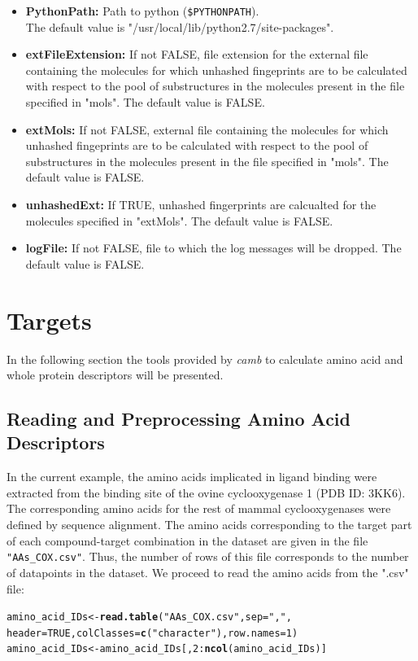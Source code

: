\documentclass[twoside,a4wide,12pt]{article}\usepackage[]{graphicx}\usepackage[]{color}
\makeatletter
\newcommand{\hlnum}[1]{\textcolor[rgb]{0.686,0.059,0.569}{#1}}%
\newcommand{\hlstr}[1]{\textcolor[rgb]{0.192,0.494,0.8}{#1}}%
\newcommand{\hlopt}[1]{\textcolor[rgb]{0,0,0}{#1}}%
\newcommand{\hlstd}[1]{\textcolor[rgb]{0.345,0.345,0.345}{#1}}%
\newcommand{\hlkwb}[1]{\textcolor[rgb]{0.69,0.353,0.396}{#1}}%
\newcommand{\hlkwc}[1]{\textcolor[rgb]{0.333,0.667,0.333}{#1}}%
\newcommand{\hlkwd}[1]{\textcolor[rgb]{0.737,0.353,0.396}{\textbf{#1}}}%
\newenvironment{kframe}{%
 \def\at@end@of@kframe{}%
 \ifinner\ifhmode%
  \def\at@end@of@kframe{\end{minipage}}%
  \begin{minipage}{\columnwidth}%
 \fi\fi%
 \def\FrameCommand##1{\hskip\@totalleftmargin \hskip-\fboxsep
 \colorbox{shadecolor}{##1}\hskip-\fboxsep
     \hskip-\linewidth \hskip-\@totalleftmargin \hskip\columnwidth}%
 \MakeFramed {\advance\hsize-\width
   \@totalleftmargin\z@ \linewidth\hsize
   \@setminipage}}%
 {\par\unskip\endMakeFramed%
 \at@end@of@kframe}
\newenvironment{knitrout}{}{} %
\makeatother
\begin{document}
\begin{itemize}
\item {\bf PythonPath:} Path to python (\verb|$PYTHONPATH|).\\
The default value is "/usr/local/lib/python2.7/site-packages".
\item {\bf extFileExtension:} If not FALSE, file extension for the external file containing the molecules for which unhashed fingeprints are to be calculated with respect to the pool of substructures in the molecules present in the file specified in "mols". The default value is FALSE.
\item {\bf extMols:} If not FALSE, external file containing the molecules for which unhashed fingeprints are to be calculated with respect to the pool of
substructures in the molecules present in the file specified in "mols". The default value is FALSE.
\item {\bf unhashedExt:} If TRUE, unhashed fingerprints are calcualted for the molecules specified in "extMols". The default value is FALSE.
\item {\bf logFile:} If not FALSE, file to which the log messages will be dropped. The default value is FALSE.
\end{itemize}


\section{Targets}

In the following section the tools provided by {\it camb} to calculate amino acid and whole protein descriptors will be presented.

\subsection{Reading and Preprocessing Amino Acid Descriptors}
In the current example, the amino acids implicated in ligand binding were extracted from the binding site of the ovine cyclooxygenase 1 (PDB ID: 3KK6). The corresponding amino acids for the rest of mammal cyclooxygenases were defined by sequence alignment.
The amino acids corresponding to the target part of each compound-target combination in the dataset are given in the file \verb|"AAs_COX.csv"|. Thus, the number of rows of this file corresponds to the number of datapoints in the dataset.
We proceed to read the amino acids from the ".csv" file:
\begin{knitrout}
\color{fgcolor}\begin{kframe}
\begin{alltt}
\hlstd{amino_acid_IDs} \hlkwb{<-} \hlkwd{read.table}\hlstd{(}\hlstr{"AAs_COX.csv"}\hlstd{,} \hlkwc{sep} \hlstd{=} \hlstr{","}\hlstd{,}
    \hlkwc{header} \hlstd{=} \hlnum{TRUE}\hlstd{,} \hlkwc{colClasses} \hlstd{=} \hlkwd{c}\hlstd{(}\hlstr{"character"}\hlstd{),} \hlkwc{row.names} \hlstd{=} \hlnum{1}\hlstd{)}
\hlstd{amino_acid_IDs} \hlkwb{<-} \hlstd{amino_acid_IDs[,} \hlnum{2}\hlopt{:}\hlkwd{ncol}\hlstd{(amino_acid_IDs)]}
\end{alltt}
\end{kframe}
\end{knitrout}
\end{document}
